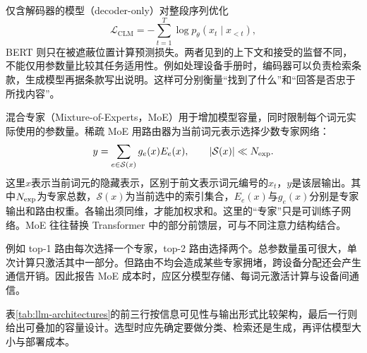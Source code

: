仅含解码器的模型（decoder-only）对整段序列优化
\begin{equation}
 \mathcal{L}_{\mathrm{CLM}}=-\sum_{t=1}^{T}\log p_\theta(x_t\mid x_{<t}),
\end{equation}
BERT 则只在被遮蔽位置计算预测损失。两者见到的上下文和接受的监督不同，不能仅用参数量比较其任务适用性。例如处理设备手册时，编码器可以负责检索条款，生成模型再据条款写出说明。这样可分别衡量“找到了什么”和“回答是否忠于所找内容”。

混合专家（Mixture-of-Experts，MoE）用于增加模型容量，同时限制每个词元实际使用的参数量。稀疏 MoE 用路由器为当前词元表示选择少数专家网络：
\begin{equation}
 y=\sum_{e\in\mathcal{S}(x)}g_e(x)E_e(x),\qquad |\mathcal{S}(x)|\ll N_{\rm exp}.
\end{equation}
这里$x$表示当前词元的隐藏表示，区别于前文表示词元编号的$x_t$，$y$是该层输出。其中$N_{\rm exp}$为专家总数，$\mathcal S(x)$为当前选中的索引集合，$E_e(x)$与$g_e(x)$分别是专家输出和路由权重。各输出须同维，才能加权求和。这里的“专家”只是可训练子网络。MoE 往往替换 Transformer 中的部分前馈层，可与不同注意力结构结合。

例如 top-1 路由每次选择一个专家，top-2 路由选择两个。总参数量虽可很大，单次计算只激活其中一部分。但路由不均会造成某些专家拥堵，跨设备分配还会产生通信开销。因此报告 MoE 成本时，应区分模型存储、每词元激活计算与设备间通信。

\begin{table}[htbp]
\centering
\caption{语言模型架构与工业任务匹配}
\label{tab:llm-architectures}
\scriptsize
\setlength{\tabcolsep}{3pt}
\end{table}

表\ref{tab:llm-architectures}的前三行按信息可见性与输出形式比较架构，最后一行则给出可叠加的容量设计。选型时应先确定要做分类、检索还是生成，再评估模型大小与部署成本。


